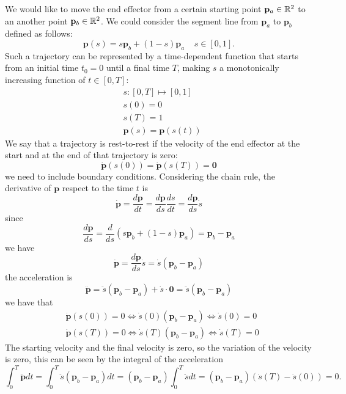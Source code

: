 \documentclass[10pt, letterpaper]{report}
\begin{document}
We would like to move the end effector from a certain starting point $\mathbf p_a\in {\mathbb R}^2$ to an another point $\mathbf p_b\in{\mathbb R}^2$. We could consider the segment line from $\mathbf p_a$ to $\mathbf p_b$ defined as follows:\begin{equation}
    \mathbf p(s)=s\mathbf p_b+(1-s)\mathbf p_a \ \ \ \ \ s\in[0,1].
\end{equation}
Such a trajectory can be represented by a time-dependent function that starts from an initial time $t_0=0$ until a final time $T$, making $s$ a monotonically increasing function of $t\in[0,T]$:\begin{align}
    &s:[0,T]\longmapsto [0,1]\\
    &s(0)=0\\
    &s(T)=1\\
    &\mathbf p(s)=\mathbf p(s(t))
\end{align}
We say that a trajectory is rest-to-rest if the velocity of the end effector at the start and at the end of that trajectory is zero:\begin{equation}
    \dot{\mathbf p}(s(0))=\dot{\mathbf p}(s(T))=\mathbf 0
\end{equation}
 we need to include boundary conditions. Considering the chain rule, the derivative of $\mathbf p$ respect to the time $t$ is\begin{equation}
    \dot{\mathbf p}=\frac{d\mathbf p}{dt}=\frac{d\mathbf p}{ds}\frac{ds}{dt}=\frac{d\mathbf p}{ds}\dot s
\end{equation}
since\begin{equation}
    \frac{d\mathbf p}{ds}=\frac{d}{ds}\left(s\mathbf p_b+(1-s)\mathbf p_a\right)=\mathbf p_b-\mathbf p_a
\end{equation}
we have
\begin{equation}
    \dot{\mathbf p}=\frac{d\mathbf p}{ds}\dot s=\dot s(\mathbf p_b-\mathbf p_a)
\end{equation}
the acceleration is\begin{equation}
    \ddot{\mathbf p}=\ddot s(\mathbf p_b-\mathbf p_a)+\dot s\cdot \mathbf 0=\ddot s(\mathbf p_b-\mathbf p_a)
\end{equation}
we have that\begin{align}
    &\dot{\mathbf p}(s(0))=0\iff \dot s(0)(\mathbf p_b-\mathbf p_a)\iff \dot s(0)=0\\
    &\dot{\mathbf p}(s(T))=0\iff \dot s(T)(\mathbf p_b-\mathbf p_a)\iff \dot s(T)=0
\end{align}
The starting velocity and the final velocity is zero, so the variation of the velocity is zero, this can be seen by the integral of the acceleration\begin{equation}
    \int_0^T\ddot{\mathbf p}dt=\int_0^T\ddot s(\mathbf p_b-\mathbf p_a)dt=(\mathbf p_b-\mathbf p_a)\int_0^T\ddot sdt=(\mathbf p_b-\mathbf p_a)(\dot s(T)-\dot s(0))=0.
\end{equation}
\end{document}
